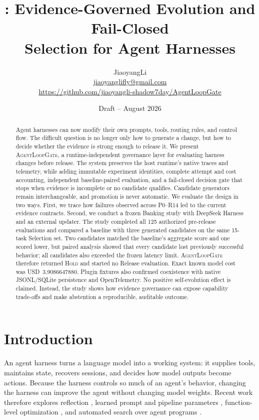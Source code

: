 \documentclass[10pt,twocolumn]{article}
\title{\system: Evidence-Governed Evolution and Fail-Closed\\
Selection for Agent Harnesses}
\author{JiaoyangLi\\
\small \href{mailto:jiaoyanglifly@gmail.com}{jiaoyanglifly@gmail.com}\\
\small \url{https://github.com/jiaoyangli-shadow7day/AgentLoopGate}}
\date{Draft -- August 2026}
\newcommand{\system}{\textsc{AgentLoopGate}\xspace}
\newcommand{\hold}{\textsc{Hold}\xspace}
\begin{document}
\maketitle

\begin{abstract}
Agent harnesses can now modify their own prompts, tools, routing rules, and
control flow. The difficult question is no longer only how to generate a
change, but how to decide whether the evidence is strong enough to release it.
We present \system, a runtime-independent governance layer for evaluating
harness changes before release. The system preserves the host runtime's native
traces and telemetry, while adding immutable experiment identities, complete
attempt and cost accounting, independent baseline-paired evaluation, and a
fail-closed decision gate that stops when evidence is incomplete or no
candidate qualifies. Candidate generators remain interchangeable, and
promotion is never automatic. We evaluate the design in two ways. First, we
trace how failures observed across P0--R14 led to the current evidence
contracts. Second, we conduct a frozen Banking study with DeepSeek Harness and
an external updater. The study completed all 125 authorized pre-release
evaluations and compared a baseline with three generated candidates on the
same 15-task Selection set. Two candidates matched the baseline's aggregate
score and one scored lower, but paired analysis showed that every candidate
lost previously successful behavior; all candidates also exceeded the frozen
latency limit. \system therefore returned \hold and started no Release
evaluation. Exact known model cost was USD~3.9086647880. Plugin fixtures also
confirmed coexistence with native JSONL/SQLite persistence and OpenTelemetry.
No positive self-evolution effect is claimed. Instead, the study shows how
evidence governance can expose capability trade-offs and make abstention a
reproducible, auditable outcome.
\end{abstract}

\section{Introduction}

An agent harness turns a language model into a working system: it supplies
tools, maintains state, recovers sessions, and decides how model outputs become
actions. Because the harness controls so much of an agent's behavior, changing
the harness can improve the agent without changing model weights. Recent work
therefore explores reflection \cite{shinn2023reflexion,madaan2023selfrefine},
learned prompt and pipeline parameters \cite{khattab2023dspy}, function-level
optimization \cite{zhang2024agentoptimizer}, and automated search over agent
programs \cite{hu2024adas}.
\end{document}
